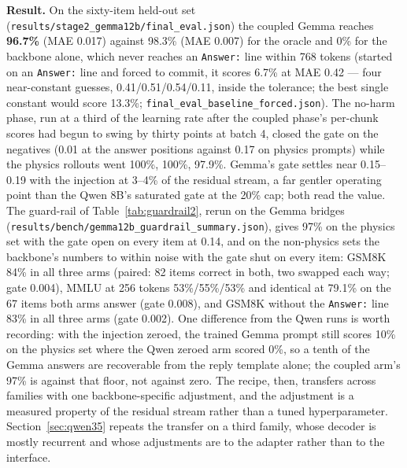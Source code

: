 \documentclass[11pt]{article}
\newcommand{\code}[1]{\texttt{#1}}
\begin{document}
\textbf{Result.} On the sixty-item held-out set (\code{results/stage2\_gemma12b/final\_eval.json}) the coupled Gemma reaches \textbf{96.7\%} (MAE 0.017) against 98.3\% (MAE 0.007) for the oracle and 0\% for the backbone alone, which never reaches an \code{Answer:} line within 768 tokens (started on an \code{Answer:} line and forced to commit, it scores 6.7\% at MAE 0.42 --- four near-constant guesses, 0.41/0.51/0.54/0.11, inside the tolerance; the best single constant would score 13.3\%; \code{final\_eval\_baseline\_forced.json}). The no-harm phase, run at a third of the learning rate after the coupled phase's per-chunk scores had begun to swing by thirty points at batch 4, closed the gate on the negatives (0.01 at the answer positions against 0.17 on physics prompts) while the physics rollouts went 100\%, 100\%, 97.9\%. Gemma's gate settles near 0.15--0.19 with the injection at 3--4\% of the residual stream, a far gentler operating point than the Qwen 8B's saturated gate at the 20\% cap; both read the value. The guard-rail of Table~\ref{tab:guardrail2}, rerun on the Gemma bridges (\code{results/bench/gemma12b\_guardrail\_summary.json}), gives 97\% on the physics set with the gate open on every item at 0.14, and on the non-physics sets the backbone's numbers to within noise with the gate shut on every item: GSM8K 84\% in all three arms (paired: 82 items correct in both, two swapped each way; gate 0.004), MMLU at 256 tokens 53\%/55\%/53\% and identical at 79.1\% on the 67 items both arms answer (gate 0.008), and GSM8K without the \code{Answer:} line 83\% in all three arms (gate 0.002). One difference from the Qwen runs is worth recording: with the injection zeroed, the trained Gemma prompt still scores 10\% on the physics set where the Qwen zeroed arm scored 0\%, so a tenth of the Gemma answers are recoverable from the reply template alone; the coupled arm's 97\% is against that floor, not against zero. The recipe, then, transfers across families with one backbone-specific adjustment, and the adjustment is a measured property of the residual stream rather than a tuned hyperparameter. Section~\ref{sec:qwen35} repeats the transfer on a third family, whose decoder is mostly recurrent and whose adjustments are to the adapter rather than to the interface.
\end{document}
